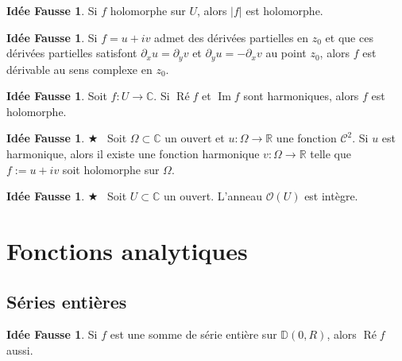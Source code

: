 \documentclass[11pt,a4paper]{article}
\newcommand{\D}{\mathbb{D}}
\newcommand{\R}{\mathbb{R}}
\newcommand{\C}{\mathbb{C}}
\DeclareMathOperator{\PR}{\text{Ré}}
\DeclareMathOperator{\PI}{\text{Im}}
\theoremstyle{definition}
\newtheorem{ideeFausse}[theoreme]{Idée Fausse}
\theoremstyle{plain}
\newcommand{\important}{$\bigstar$~}
\begin{document}
\begin{ideeFausse}
Si $f$ holomorphe sur $U$, alors $|f|$ est holomorphe.
\end{ideeFausse}

\begin{ideeFausse}
Si $f=u+iv$ admet des dérivées partielles en $z_0$ et que ces dérivées partielles satisfont $\partial_x u = \partial_y v$ et $\partial_y u = -\partial_x v$ au point $z_0$, alors $f$ est dérivable au sens complexe en $z_0$.
\end{ideeFausse}

\begin{ideeFausse}
Soit $f : U\to \C$. Si $\PR f$ et $\PI f$ sont harmoniques, alors $f$ est holomorphe.
\end{ideeFausse}

\begin{ideeFausse} \important
Soit $\Omega\subset \C$ un ouvert et $u : \Omega\to \R$ une fonction $\mathcal C^2$.
Si $u$ est harmonique, alors il existe une fonction harmonique $v : \Omega\to \R$ telle que $f:=u+iv$ soit holomorphe sur $\Omega$.
\end{ideeFausse}


\begin{ideeFausse} \important
Soit $U\subset \C$ un ouvert. L'anneau $\mathcal O(U)$ est intègre.
\end{ideeFausse}


%



\section{Fonctions analytiques}

\subsection{Séries entières}

\begin{ideeFausse}
Si $f$ est une somme de série entière sur $\D(0,R)$, alors $\PR f$ aussi.
\end{ideeFausse}
\end{document}
